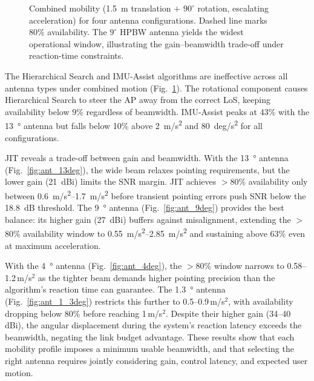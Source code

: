 \documentclass[fleqn,10pt]{wlscirep}
\newcommand{\legline}[2]{%
    \tikz[baseline=-0.5ex]{
        \draw[#1, #2, line width=1.5pt] (0,0) -- (0.5,0);
    }%
}
\begin{document}
\begin{figure}[ht!]

    \caption{Combined mobility (1.5~m translation $+$ $90^\circ$ rotation, escalating acceleration) for four antenna configurations. Dashed line marks 80\% availability. The $9^\circ$ HPBW antenna yields the widest operational window, illustrating the gain--beamwidth trade-off under reaction-time constraints.}
    \label{fig:antenna_comparison}
    \vspace{-5pt}
\end{figure}

The Hierarchical Search and IMU-Assist algorithms are ineffective across all antenna types under combined motion (Fig.~\ref{fig:antenna_comparison}). The rotational component causes Hierarchical Search to steer the AP away from the correct LoS, keeping availability below 9\% regardless of beamwidth. IMU-Assist peaks at 43\% with the \SI{13}{\degree} antenna but falls below 10\% above \SI{2}{m/s^2} and \SI{80}{deg/s^2} for all configurations.

JIT reveals a trade-off between gain and beamwidth. With the \SI{13}{\degree} antenna (Fig.~\ref{fig:ant_13deg}), the wide beam relaxes pointing requirements, but the lower gain (\SI{21}{dBi}) limits the SNR margin. JIT achieves $>$80\% availability only between \SIrange{0.6}{1.7}{m/s^2} before transient pointing errors push SNR below the \SI{18.8}{dB} threshold. The \SI{9}{\degree} antenna (Fig.~\ref{fig:ant_9deg}) provides the best balance: its higher gain (\SI{27}{dBi}) buffers against misalignment, extending the $>$80\% availability window to \SIrange{0.55}{2.85}{m/s^2} and sustaining above 63\% even at maximum acceleration.

With the \SI{4}{\degree} antenna (Fig.~\ref{fig:ant_4deg}), the $>$80\% window narrows to 0.58--1.2\,m/s$^2$ as the tighter beam demands higher pointing precision than the algorithm's reaction time can guarantee. The \SI{1.3}{\degree} antenna (Fig.~\ref{fig:ant_1_3deg}) restricts this further to 0.5--0.9\,m/s$^2$, with availability dropping below 80\% before reaching 1\,m/s$^2$. Despite their higher gain (34--40\,dBi), the angular displacement during the system's reaction latency exceeds the beamwidth, negating the link budget advantage. These results show that each mobility profile imposes a minimum usable beamwidth, and that selecting the right antenna requires jointly considering gain, control latency, and expected user motion.
\end{document}

